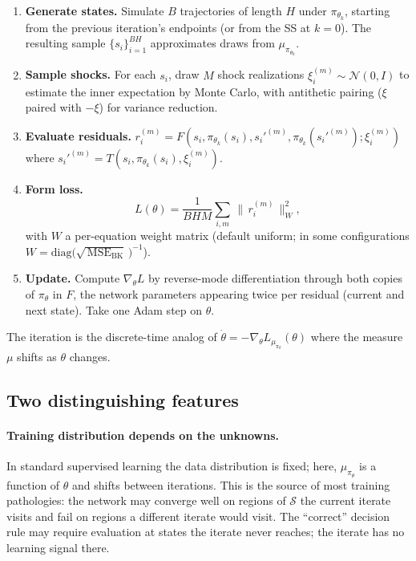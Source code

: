 \documentclass[11pt]{article}
\begin{document}
\begin{enumerate}
\item \textbf{Generate states.} Simulate $B$ trajectories of length
  $H$ under $\pi_{\theta_k}$, starting from the previous iteration's
  endpoints (or from the SS at $k = 0$). The resulting sample
  $\{s_i\}_{i=1}^{BH}$ approximates draws from $\mu_{\pi_{\theta_k}}$.
\item \textbf{Sample shocks.} For each $s_i$, draw $M$ shock
  realizations $\xi_i^{(m)} \sim \mathcal{N}(0, I)$ to estimate the
  inner expectation by Monte Carlo, with antithetic pairing
  ($\xi$ paired with $-\xi$) for variance reduction.
\item \textbf{Evaluate residuals.}
  $r_i^{(m)} = F(s_i, \pi_{\theta_k}(s_i), s_i'^{(m)}, \pi_{\theta_k}(s_i'^{(m)}); \xi_i^{(m)})$
  where $s_i'^{(m)} = T(s_i, \pi_{\theta_k}(s_i), \xi_i^{(m)})$.
\item \textbf{Form loss.}
  \[
    L(\theta) = \frac{1}{BHM}\sum_{i,m}\,\big\|\,r_i^{(m)}\,\big\|_W^2,
  \]
  with $W$ a per-equation weight matrix (default uniform; in some
  configurations $W = \mathrm{diag}\!\big(\sqrt{\,\mathrm{MSE}_{\text{BK}}}\,\big)^{-1}$).
\item \textbf{Update.} Compute $\nabla_\theta L$ by reverse-mode
  differentiation through both copies of $\pi_\theta$ in $F$, the
  network parameters appearing twice per residual (current and
  next state). Take one Adam step on $\theta$.
\end{enumerate}

The iteration is the discrete-time analog of
$\dot\theta = -\nabla_\theta L_{\mu_{\pi_\theta}}(\theta)$ where the
measure $\mu$ shifts as $\theta$ changes.

\subsection{Two distinguishing features}

\paragraph{Training distribution depends on the unknowns.}
In standard supervised learning the data distribution is fixed; here,
$\mu_{\pi_\theta}$ is a function of $\theta$ and shifts between
iterations. This is the source of most training pathologies: the
network may converge well on regions of $\mathcal{S}$ the current
iterate visits and fail on regions a different iterate would visit. The
``correct'' decision rule may require evaluation at states the iterate
never reaches; the iterate has no learning signal there.
\end{document}

